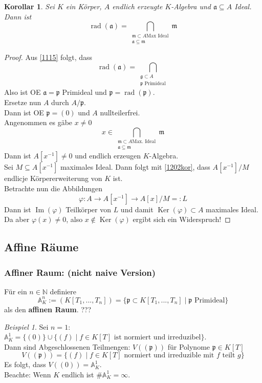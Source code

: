 \documentclass[10pt,a4paper]{article}
\newcommand{\N}{\ensuremath{\mathbb{N}}}
\newcommand{\AF}{\ensuremath{\mathbb{A}}}
\newcommand{\Ker}{\ensuremath{\operatorname{Ker}}}
\newcommand{\Img}{\ensuremath{\operatorname{Im}}}
\newcommand{\rad}{\ensuremath{\operatorname{rad}}}
\newcounter{thm}[section]
\let\oldsubsubsection\subsubsection
\renewcommand{\subsubsection}{\stepcounter{thm}\oldsubsubsection}
\theoremstyle{definition}
\theoremstyle{plain}
\newtheorem{kor}[thm]{Korollar}
\theoremstyle{remark}
\newtheorem*{exm*}{Beispiel}
\begin{document}
\begin{kor}\label{1204kor}
	Sei $K$ ein Körper, $A$ endlich erzeugte $K$-Algebra und $\mathfrak a\subseteq A$ Ideal.\\
	Dann ist
	\[\rad(\mathfrak a)=\bigcap_{\substack{\mathfrak m\subset A\text{Max Ideal}\\\mathfrak a\subseteq \mathfrak m}}\mathfrak m\]
\end{kor}
\begin{proof}
	Aus \ref{1115} folgt, dass
	\[\rad(\mathfrak a)=\bigcap_{\substack{\mathfrak g\subset A\\\text{$\mathfrak p$ Primideal}}}\]
	Also ist OE $\mathfrak a=\mathfrak p$ Primideal und $\mathfrak p=\rad(\mathfrak p)$.\\
	Ersetze nun $A$ durch $A/\mathfrak p$.\\
	Dann ist OE $\mathfrak p=(0)$ und $A$ nullteilerfrei.\\
	Angenommen es gäbe $x\neq0$
	\[x\in\bigcap_{\substack{\mathfrak m\subset A\text{Max. Ideal}\\\mathfrak a\subseteq \mathfrak m}}\mathfrak m\]
	Dann ist $A[x^{-1}]\neq 0$ und endlich erzeugen $K$-Algebra.\\
	Sei $M\subseteq A[x^{-1}]$ maximales Ideal. Dann folgt mit \ref{1202kor}, dass $A[x^{-1}]/M$ endlicje Körpererweiterung von $K$ ist.\\
	Betrachte nun die Abbildungen
	\[\varphi:A\to A[x^{-1}]\to A[x]/M=:L\]
	Dann ist $\Img(\varphi)$ Teilkörper von $L$ und damit $\Ker(\varphi)\subset A$ maximales Ideal.\\
	Da aber $\varphi(x)\neq 0$, also $x\notin\Ker(\varphi)$ ergibt sich ein Widerspruch!
\end{proof}



\subsection{Affine Räume}

\subsubsection{Affiner Raum: (nicht naive Version)}
	Für ein $n\in\N$ definiere
	\[\AF^n_K:=(K[T_1,...,T_n])=\{\mathfrak p\subset K[T_1,...,T_n]\mid\text{$\mathfrak p$ Primideal}\}\]
	als den \textbf{affinen Raum}.
	??? %


\begin{exm*}
	Sei $n=1$: $\AF_K^1=\{(0)\}\cup\{(f)\mid \text{$f\in K[T]$ ist normiert und irreduzibel}\}$.\\
	Dann sind Abgeschlossenen Teilmengen: $V((\mathfrak p))$ für Polynome $\mathfrak p\in K[T]$
	\[V((\mathfrak p))=\{(f)\mid \text{$f\in K[T]$ normiert und irreduzible mit $f$ teilt $g$}\}\]
	Es folgt, dass $V((0))=\AF_K^1$.\\
	Beachte: Wenn $K$ endlich ist $\#\AF_K^1=\infty$.
\end{exm*}
\end{document}
